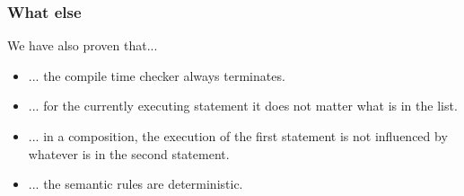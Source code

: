 \documentclass{beamer}
\begin{document}
\begin{frame}
\frametitle{What else}
We have also proven that...
\begin{itemize}
    \item ... the compile time checker always terminates.
    \item ... for the currently executing statement it does not matter what is in the list.
    \item ... in a composition, the execution of the first statement is not influenced by whatever is in the second statement.
    \item ... the semantic rules are deterministic.
\end{itemize}
\end{frame}
\end{document}
